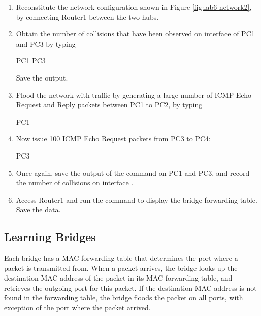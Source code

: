 \begin{enumerate}
	\item Reconstitute the network configuration shown in Figure \ref{fig:lab6-network2}, by connecting Router1 between the two hubs.
	\item Obtain the number of collisions that have been observed on interface  of PC1 and PC3 by typing
		\begin{cmdblock}
	PC1%
	PC3%
		\end{cmdblock}
		Save the output.
	\item Flood the network with traffic by generating a large number of ICMP Echo Request and Reply packets between PC1 to PC2, by typing 
		\begin{cmdblock}
	PC1%
		\end{cmdblock}
	\item Now issue 100 ICMP Echo Request packets from PC3 to PC4: 
		\begin{cmdblock}
	PC3%
		\end{cmdblock}
	\item Once again, save the output of the command  on PC1 and PC3, and record the number of collisions on interface .
	\item Access Router1 and run the  command to display the bridge forwarding table. Save the data.
\end{enumerate}

\begin{questions}
\end{questions}
	
\newpage
\subsection{Learning Bridges}

Each bridge has a MAC forwarding table that determines the port where a packet is transmitted from. When a packet arrives, the bridge looks up the destination MAC address of the packet in its MAC forwarding table, and retrieves the outgoing port for this packet. If the destination MAC address is not found in the forwarding table, the bridge floods the packet on all ports, with exception of the port where the packet arrived.

